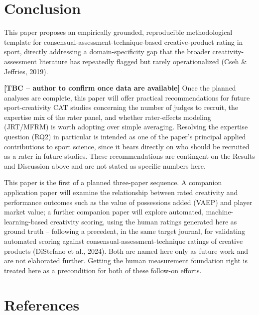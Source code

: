\documentclass[
  12pt,
]{article}
\begin{document}
\section{Conclusion}\label{conclusion}

This paper proposes an empirically grounded, reproducible methodological
template for consensual-assessment-technique-based creative-product
rating in sport, directly addressing a domain-specificity gap that the
broader creativity-assessment literature has repeatedly flagged but
rarely operationalized (Cseh \& Jeffries, 2019).

\textbf{{[}TBC -- author to confirm once data are available{]}} Once the
planned analyses are complete, this paper will offer practical
recommendations for future sport-creativity CAT studies concerning the
number of judges to recruit, the expertise mix of the rater panel, and
whether rater-effects modeling (JRT/MFRM) is worth adopting over simple
averaging. Resolving the expertise question (RQ2) in particular is
intended as one of the paper's principal applied contributions to sport
science, since it bears directly on who should be recruited as a rater
in future studies. These recommendations are contingent on the Results
and Discussion above and are not stated as specific numbers here.

This paper is the first of a planned three-paper sequence. A companion
application paper will examine the relationship between rated creativity
and performance outcomes such as the value of possessions added (VAEP)
and player market value; a further companion paper will explore
automated, machine-learning-based creativity scoring, using the human
ratings generated here as ground truth -- following a precedent, in the
same target journal, for validating automated scoring against
consensual-assessment-technique ratings of creative products (DiStefano
et al., 2024). Both are named here only as future work and are not
elaborated further. Getting the human measurement foundation right is
treated here as a precondition for both of these follow-on efforts.

\section{References}\label{references}
\end{document}
